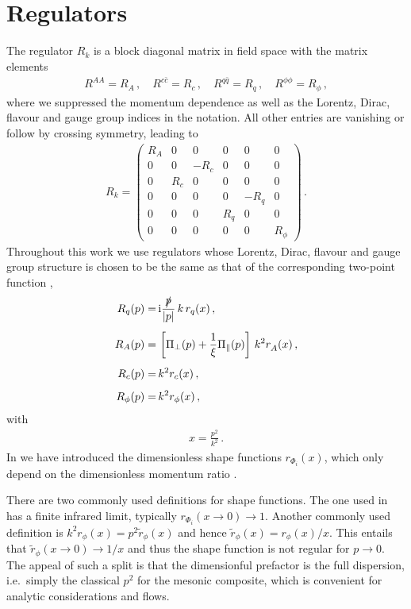 \documentclass[aps,twocolumn,prd,superscriptaddress]{revtex4-2}
\begin{document}
\section{Regulators}
\label{app:regs}

The regulator $R_k$ is a block diagonal matrix in field space with the matrix elements 
%
	\begin{align}
R^{AA} =R_A\,, \quad R^{c\bar c} =R_c\,, \quad R^{q\bar q} =R_q\,, \quad R^{\phi\phi} = R_\phi\,,
\end{align}
%
where we suppressed the momentum dependence as well as the Lorentz, Dirac, flavour and gauge group indices in the notation. All other entries are vanishing or follow by crossing symmetry, leading to 
%
	\begin{align}
		R_k= \begin{pmatrix}
		R_A & 0 & 0& 0 & 0& 0\\[1ex]
		0 & 0 & -R_c & 0 & 0& 0\\[1ex]
		0 & R_c  &  0  & 0 & 0& 0\\[1ex]
		0 & 0 & 0  & 0 & -R_q & 0\\[1ex]
		0 & 0 & 0 & R_q & 0 & 0\\[1ex]
	0 & 0 & 0 & 0 & 0      & R_\phi
	\end{pmatrix}\,.
\label{eq:QCD-RegulatorMatrix}
\end{align}
%
Throughout this work we use regulators whose Lorentz, Dirac, flavour and gauge group structure is chosen to be the same as that of the corresponding two-point function ,
%
\begin{align}
	R_q(p) =& \,{\textrm{i}}\frac{\slashed{p}}{|p|}\, k\, r_q(x)\,,
	\notag\\[1ex]
	R_A(p) =&\, \left[\Pi_\perp(p) + \frac{1}{\xi} \Pi_\parallel(p)\right]\,k^2 r^{\ }_{A}(x)\,,
	\notag\\[1ex]
	R_{c}(p) = &\,k^2 r_{c}(x)\,,
	\notag\\[1ex]
	R_\phi(p) = &\, k^2 r_{\phi}(x)\,, 
\label{eq:RegPhi}
\end{align}
%
with 
%
\begin{align}
	x=\frac{p^2}{k^2}\,.
\label{eq:x}
\end{align}
%
In	 we have introduced the dimensionless shape functions $r_{\Phi_i}(x)$, which only depend on the dimensionless momentum ratio . 

There are two commonly used definitions for shape functions. The one used in  has a finite infrared limit, typically $r_{\Phi_i}(x\to 0)\to 1$.
Another commonly used definition is $ k^2 r_\phi(x)=  p^2 \tilde r_\phi(x) $ and hence $\tilde r_\phi(x) =r_{\phi}(x)/x$. 
This entails that $\tilde r_\phi(x\to 0) \to 1/x$ and thus the shape function is not regular for $p\to  0$. The appeal of such a split is that the dimensionful prefactor is the full dispersion, i.e.~simply the classical $p^2$ for the mesonic composite, which is convenient for analytic considerations and flows.
\end{document}
